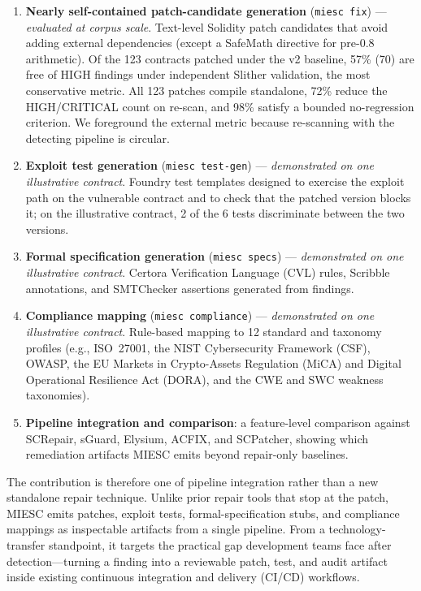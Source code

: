 \documentclass[conference]{IEEEtran}
\begin{document}
\begin{enumerate}
    \item \textbf{Nearly self-contained patch-candidate generation} (\texttt{miesc fix}) --- \emph{evaluated at corpus scale}. Text-level Solidity patch candidates that avoid adding external dependencies (except a SafeMath directive for pre-0.8 arithmetic). Of the 123 contracts patched under the v2 baseline, 57\% (70) are free of HIGH findings under independent Slither validation, the most conservative metric. All 123 patches compile standalone, 72\% reduce the HIGH/CRITICAL count on re-scan, and 98\% satisfy a bounded no-regression criterion. We foreground the external metric because re-scanning with the detecting pipeline is circular.
    \item \textbf{Exploit test generation} (\texttt{miesc test-gen}) --- \emph{demonstrated on one illustrative contract}. Foundry test templates designed to exercise the exploit path on the vulnerable contract and to check that the patched version blocks it; on the illustrative contract, 2 of the 6 tests discriminate between the two versions.
    \item \textbf{Formal specification generation} (\texttt{miesc specs}) --- \emph{demonstrated on one illustrative contract}. Certora Verification Language (CVL) rules, Scribble annotations, and SMTChecker assertions generated from findings.
    \item \textbf{Compliance mapping} (\texttt{miesc compliance}) --- \emph{demonstrated on one illustrative contract}. Rule-based mapping to 12 standard and taxonomy profiles (e.g., ISO~27001, the NIST Cybersecurity Framework (CSF), OWASP, the EU Markets in Crypto-Assets Regulation (MiCA) and Digital Operational Resilience Act (DORA), and the CWE and SWC weakness taxonomies).
    \item \textbf{Pipeline integration and comparison}: a feature-level comparison against SCRepair, sGuard, Elysium, ACFIX, and SCPatcher, showing which remediation artifacts MIESC emits beyond repair-only baselines.
\end{enumerate}

The contribution is therefore one of pipeline integration rather than a new standalone repair technique. Unlike prior repair tools that stop at the patch, MIESC emits patches, exploit tests, formal-specification stubs, and compliance mappings as inspectable artifacts from a single pipeline. From a technology-transfer standpoint, it targets the practical gap development teams face after detection---turning a finding into a reviewable patch, test, and audit artifact inside existing continuous integration and delivery (CI/CD) workflows.
\end{document}
